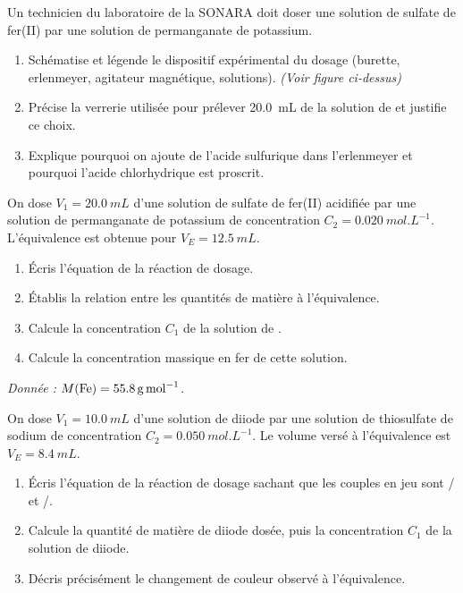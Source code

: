 \documentclass[11pt]{article}
\begin{document}
\begin{exercice}
Un technicien du laboratoire de la SONARA doit doser une solution de sulfate de fer(II) par une solution de permanganate de potassium.
\begin{enumerate}
\item Schématise et légende le dispositif expérimental du dosage (burette, erlenmeyer, agitateur magnétique, solutions). \emph{(Voir figure ci-dessus)}
\item Précise la verrerie utilisée pour prélever \SI{20,0}{mL} de la solution de  et justifie ce choix.
\item Explique pourquoi on ajoute de l'acide sulfurique dans l'erlenmeyer et pourquoi l'acide chlorhydrique est proscrit.
\end{enumerate}
\end{exercice}

\begin{exercice}
On dose $V_1 = \SI{20,0}{mL}$ d'une solution de sulfate de fer(II) acidifiée par une solution de permanganate de potassium de concentration $C_2 = \SI{0,020}{mol.L^{-1}}$. L'équivalence est obtenue pour $V_E = \SI{12,5}{mL}$.
\begin{enumerate}
\item Écris l'équation de la réaction de dosage.
\item Établis la relation entre les quantités de matière à l'équivalence.
\item Calcule la concentration $C_1$ de la solution de .
\item Calcule la concentration massique en fer de cette solution.
\end{enumerate}
\emph{Donnée :} $M(\ce{Fe}) = \SI{55,8}{g.mol^{-1}}$.
\end{exercice}

\begin{exercice}
On dose $V_1 = \SI{10,0}{mL}$ d'une solution de diiode par une solution de thiosulfate de sodium de concentration $C_2 = \SI{0,050}{mol.L^{-1}}$. Le volume versé à l'équivalence est $V_E = \SI{8,4}{mL}$.
\begin{enumerate}
\item Écris l'équation de la réaction de dosage sachant que les couples en jeu sont / et /.
\item Calcule la quantité de matière de diiode dosée, puis la concentration $C_1$ de la solution de diiode.
\item Décris précisément le changement de couleur observé à l'équivalence.
\end{enumerate}
\end{exercice}
\end{document}
